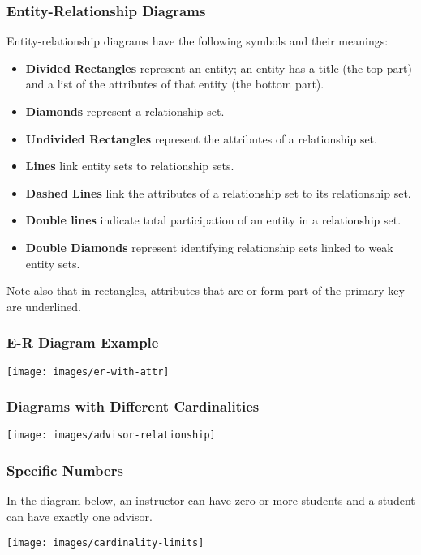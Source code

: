 \begin{frame}
\frametitle{Entity-Relationship Diagrams}

Entity-relationship diagrams have the following symbols and their meanings:

\begin{itemize}
	\item \textbf{Divided Rectangles} represent an entity; an entity has a title (the top part) and a list of the attributes of that entity (the bottom part).
	\item \textbf{Diamonds} represent a relationship set.
	\item \textbf{Undivided Rectangles} represent the attributes of a relationship set. 
	\item \textbf{Lines} link entity sets to relationship sets.
	\item \textbf{Dashed Lines} link the attributes of a relationship set to its relationship set.
	\item \textbf{Double lines} indicate total participation of an entity in a relationship set.
	\item \textbf{Double Diamonds} represent identifying relationship sets linked to weak entity sets.
\end{itemize}

Note also that in rectangles, attributes that are or form part of the primary key are underlined. 

\end{frame}



\begin{frame}
\frametitle{E-R Diagram Example}

\begin{center}
\texttt{[image: images/er-with-attr]}\\
\end{center}


\end{frame}



\begin{frame}
\frametitle{Diagrams with Different Cardinalities}

\begin{center}
\texttt{[image: images/advisor-relationship]}
\end{center}


\end{frame}


\begin{frame}
\frametitle{Specific Numbers}

In the diagram below, an instructor can have zero or more students and a student can have exactly one advisor.

\begin{center}
\texttt{[image: images/cardinality-limits]}
\end{center}

\end{frame}



